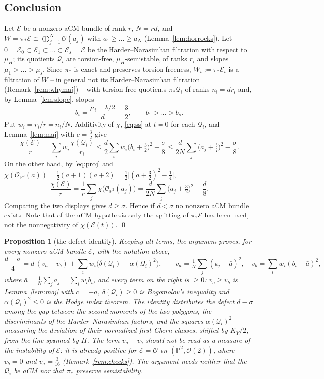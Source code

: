 \documentclass[11pt]{amsart}
\newtheorem{proposition}[theorem]{Proposition}
\theoremstyle{remark}
\theoremstyle{definition}
\newcommand{\PP}{\mathbb{P}}
\newcommand{\cO}{\mathcal{O}}
\newcommand{\cE}{\mathcal{E}}
\newcommand{\cQ}{\mathcal{Q}}
\begin{document}
\subsection*{Conclusion}
Let $\cE$ be a nonzero aCM bundle of rank $r$, $N=rd$, and $W=\pi_*\cE\cong\bigoplus_{j=1}^N\cO(a_j)$ with $a_1\ge\dots\ge a_N$ (Lemma~\ref{lem:horrocks}). Let $0=\cE_0\subset\cE_1\subset\dots\subset\cE_s=\cE$ be the Harder--Narasimhan filtration with respect to $\mu_H$; its quotients $\cQ_i$ are torsion-free, $\mu_H$-semistable, of ranks $r_i$ and slopes $\mu_1>\dots>\mu_s$. Since $\pi_*$ is exact and preserves torsion-freeness, $W_i:=\pi_*\cE_i$ is a filtration of $W$ -- in general not its Harder--Narasimhan filtration (Remark~\ref{rem:whymaj}) -- with torsion-free quotients $\pi_*\cQ_i$ of ranks $n_i=dr_i$ and, by Lemma~\ref{lem:slope}, slopes
\[
b_i=\frac{\mu_i-k/2}{d}-\frac32,\qquad b_1>\dots>b_s .
\]
Put $w_i=r_i/r=n_i/N$. Additivity of $\chi$, \eqref{eq:ss} at $t=0$ for each $\cQ_i$, and Lemma~\ref{lem:maj} with $c=\tfrac32$ give
\[
\frac{\chi(\cE)}{r}=\sum_iw_i\frac{\chi(\cQ_i)}{r_i}
\le\frac d2\sum_iw_i\bigl(b_i+\tfrac32\bigr)^2-\frac\sigma8
\le\frac{d}{2N}\sum_j\bigl(a_j+\tfrac32\bigr)^2-\frac\sigma8 .
\]
On the other hand, by \eqref{eq:proj} and $\chi(\cO_{\PP^2}(a))=\tfrac12(a+1)(a+2)=\tfrac12\bigl[(a+\tfrac32)^2-\tfrac14\bigr]$,
\[
\frac{\chi(\cE)}{r}=\frac1r\sum_j\chi\bigl(\cO_{\PP^2}(a_j)\bigr)=\frac{d}{2N}\sum_j\bigl(a_j+\tfrac32\bigr)^2-\frac d8 .
\]
Comparing the two displays gives $d\ge\sigma$. Hence if $d<\sigma$ no nonzero aCM bundle exists. Note that of the aCM hypothesis only the splitting of $\pi_*\cE$ has been used, not the nonnegativity of $\chi(\cE(t))$. \qed

\begin{proposition}[the defect identity]\label{prop:identity}
Keeping all terms, the argument proves, for every nonzero aCM bundle $\cE$, with the notation above,
\[
\frac{d-\sigma}{4}=d\,(v_a-v_b)+\sum_iw_i\bigl(\delta(\cQ_i)-\alpha(\cQ_i)^2\bigr),
\qquad v_a=\tfrac1N\textstyle\sum_j(a_j-\bar a)^2,\quad v_b=\sum_iw_i(b_i-\bar a)^2,
\]
where $\bar a=\frac1N\sum_ja_j=\sum_iw_ib_i$, and every term on the right is $\ge0$: $v_a\ge v_b$ is Lemma~\ref{lem:maj} with $c=-\bar a$, $\delta(\cQ_i)\ge0$ is Bogomolov's inequality and $\alpha(\cQ_i)^2\le0$ is the Hodge index theorem. The identity distributes the defect $d-\sigma$ among the gap between the second moments of the two polygons, the discriminants of the Harder--Narasimhan factors, and the squares $\alpha(\cQ_i)^2$ measuring the deviation of their normalized first Chern classes, shifted by $K_Y/2$, from the line spanned by $H$. The term $v_a-v_b$ should not be read as a measure of the instability of $\cE$: it is already positive for $\cE=\cO$ on $(\PP^2,\cO(2))$, where $v_b=0$ and $v_a=\tfrac3{16}$ (Remark~\ref{rem:checks}). The argument needs neither that the $\cQ_i$ be aCM nor that $\pi_*$ preserve semistability.
\end{proposition}
\end{document}
